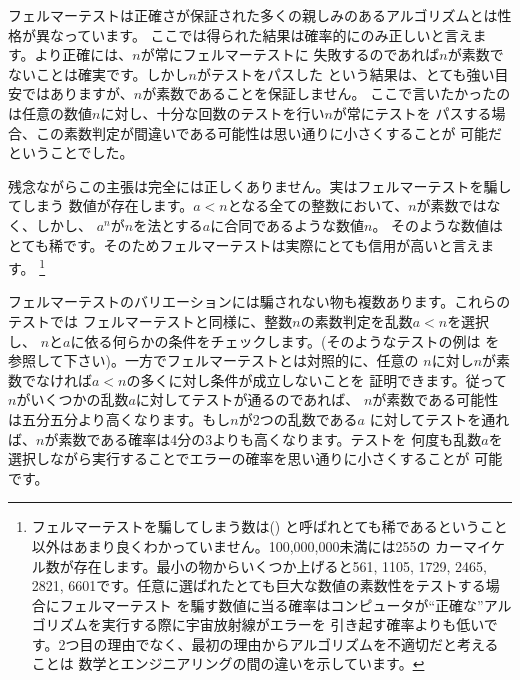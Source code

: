 フェルマーテストは正確さが保証された多くの親しみのあるアルゴリズムとは性格が異なっています。
ここでは得られた結果は確率的にのみ正しいと言えます。より正確には、\( n \)が常にフェルマーテストに
失敗するのであれば\( n \)が素数でないことは確実です。しかし\( n \)がテストをパスした
という結果は、とても強い目安ではありますが、\( n \)が素数であることを保証しません。
ここで言いたかったのは任意の数値\( n \)に対し、十分な回数のテストを行い\( n \)が常にテストを
パスする場合、この素数判定が間違いである可能性は思い通りに小さくすることが
可能だということでした。



残念ながらこの主張は完全には正しくありません。実はフェルマーテストを騙してしまう
数値が存在します。\( a < n \)となる全ての整数において、\( n \)が素数ではなく、しかし、
\( a^n \)が\( n \)を法とする\( a \)に合同であるような数値\( n \)。
そのような数値はとても稀です。そのためフェルマーテストは実際にとても信用が高いと言えます。
\footnote{\label{Footnote 1.47} フェルマーテストを騙してしまう数は()
と呼ばれとても稀であるということ以外はあまり良くわかっていません。100,000,000未満には255の
カーマイケル数が存在します。最小の物からいくつか上げると561, 1105, 1729,
2465, 2821,  6601です。任意に選ばれたとても巨大な数値の素数性をテストする場合にフェルマーテスト
を騙す数値に当る確率はコンピュータが``正確な''アルゴリズムを実行する際に宇宙放射線がエラーを
引き起す確率よりも低いです。2つ目の理由でなく、最初の理由からアルゴリズムを不適切だと考えることは
数学とエンジニアリングの間の違いを示しています。}



フェルマーテストのバリエーションには騙されない物も複数あります。これらのテストでは
フェルマーテストと同様に、整数\( n \)の素数判定を乱数\( a < n \)を選択し、
\( n \)と\( a \)に依る何らかの条件をチェックします。(そのようなテストの例は
を参照して下さい)。一方でフェルマーテストとは対照的に、任意の
\( n \)に対し\( n \)が素数でなければ\( a < n \)の多くに対し条件が成立しないことを
証明できます。従って\( n \)がいくつかの乱数\( a \)に対してテストが通るのであれば、
\( n \)が素数である可能性は五分五分より高くなります。もし\( n \)が2つの乱数である\( a \)
に対してテストを通れば、\( n \)が素数である確率は4分の3よりも高くなります。テストを
何度も乱数\( a \)を選択しながら実行することでエラーの確率を思い通りに小さくすることが
可能です。



